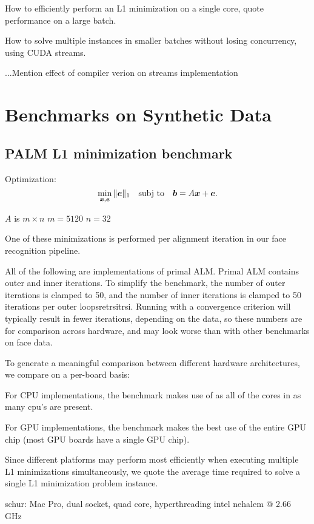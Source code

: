 \documentclass[10pt,twocolumn,letterpaper]{article}
\begin{document}
How to efficiently perform an L1 minimization on a single core, quote performance on a large batch.

How to solve multiple instances in smaller batches without losing concurrency, using CUDA streams.

...Mention effect of compiler verion on streams implementation

\section{Benchmarks on Synthetic Data}
\subsection{PALM L1 minimization benchmark}

Optimization:
\begin{equation}
\min_{{\boldsymbol{x}}, \boldsymbol{e}} \|\boldsymbol{e}\|_1 \quad \textup{subj to} \quad \boldsymbol{b} = A {\boldsymbol{x}} + \boldsymbol{e}.
\end{equation}

$A$ is $m \times n$
$m = 5120$
$n = 32$

One of these minimizations is performed per 
alignment iteration in our face recognition pipeline.

All of the following are implementations of primal ALM.
Primal ALM contains outer and inner iterations.
To simplify the benchmark, the number of outer iterations
is clamped to 50, and the number of inner iterations is
clamped to 50 iterations per outer loopsretrsitrsi.  Running with
a convergence criterion will typically result in fewer
iterations, depending on the data, so these numbers are
for comparison across hardware, and may look worse than
with other benchmarks on face data.

To generate a meaningful comparison between different hardware
architectures, we compare on a per-board basis:

For CPU implementations, the benchmark makes use of
as all of the cores in as many cpu's are present.

For GPU implementations, the benchmark makes the best use
of the entire GPU chip (most GPU boards have a single GPU chip).

Since different platforms may perform most efficiently when
executing multiple L1 minimizations simultaneously,
we quote the average time required to solve a single L1
minimization problem instance.

schur:  Mac Pro, dual socket, quad core, hyperthreading intel nehalem @ 2.66 GHz
\end{document}
